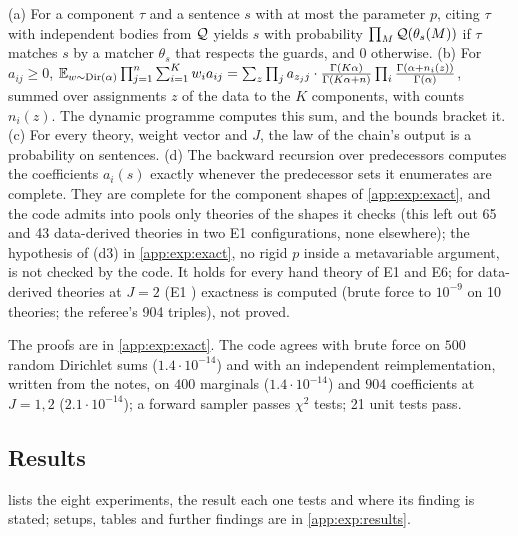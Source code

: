 \begin{proposition}\expbrk{}\label{prop:exp:exact}
\textup{(a)} For a component $\tau$ and a sentence $s$ with at most the parameter $p$, citing $\tau$ with independent bodies from $\mathcal{Q}$ yields $s$ with probability $\prod_M\mathcal{Q}(\theta_s(M))$ if $\tau$ matches $s$ by a matcher $\theta_s$ that respects the guards, and $0$ otherwise.
\textup{(b)} For $a_{ij}\ge0$, $\mathbb{E}_{w\sim\mathrm{Dir}(\alpha)}\prod_{j=1}^n\sum_{i=1}^Kw_ia_{ij}=\sum_z\prod_ja_{z_jj}\cdot\frac{\Gamma(K\alpha)}{\Gamma(K\alpha+n)}\prod_i\frac{\Gamma(\alpha+n_i(z))}{\Gamma(\alpha)}$, summed over assignments $z$ of the data to the $K$ components, with counts $n_i(z)$. The dynamic programme computes this sum, and the bounds bracket it.
\textup{(c)} For every theory, weight vector and $J$, the law of the chain's output is a probability on sentences.
\textup{(d)} The backward recursion over predecessors computes the \Lone{} coefficients $a_i(s)$ exactly whenever the predecessor sets it enumerates are complete. They are complete for the component shapes of \cref{app:exp:exact}, and the code admits into \Lone{} pools only theories of the shapes it checks (this left out 65 and 43 data-derived theories in two E1 configurations, none elsewhere); the hypothesis of (d3) in \cref{app:exp:exact}, no rigid $p$ inside a metavariable argument, is not checked by the code. It holds for every hand theory of E1 and E6; for data-derived theories at $J=2$ (E1 ) exactness is computed (brute force to $10^{-9}$ on 10 theories; the referee's 904 triples), not proved.
\end{proposition}

\noindent The proofs are in \cref{app:exp:exact}. The code agrees with brute force on $500$ random Dirichlet sums ($1.4\cdot10^{-14}$) and with an independent reimplementation, written from the notes, on $400$ marginals ($1.4\cdot10^{-14}$) and $904$ \Lone{} coefficients at $J=1,2$ ($2.1\cdot10^{-14}$); a forward sampler passes $\chi^2$ tests; 21 unit tests pass.

\subsection{Results}\label{sec:exp:results}

 lists the eight experiments, the result each one tests and where its finding is stated; setups, tables and further findings are in \cref{app:exp:results}.


